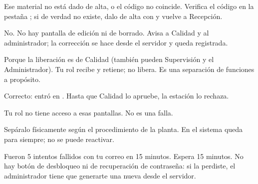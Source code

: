 \newpage
{}

Ese material no está dado de alta, o el código no coincide. Verifica el código en la
pestaña ; si de verdad no existe, dalo de alta con
 y vuelve a Recepción.

No. No hay pantalla de edición ni de borrado. Avisa a Calidad y al administrador;
la corrección se hace desde el servidor y queda registrada.

Porque la liberación es de Calidad (también pueden Supervisión y el Administrador).
Tu rol recibe y retiene; no libera. Es una separación de funciones a propósito.

Correcto: entró en \cuarentena. Hasta que Calidad lo apruebe, la estación lo rechaza.

Tu rol no tiene acceso a esas pantallas. No es una falla.

Sepáralo físicamente según el procedimiento de la planta. En el sistema queda
\rechazado{} para siempre; no se puede reactivar.

Fueron 5 intentos fallidos con tu correo en 15 minutos. Espera 15 minutos. No hay
botón de desbloqueo ni de recuperación de contraseña: si la perdiste, el
administrador tiene que generarte una nueva desde el servidor.
